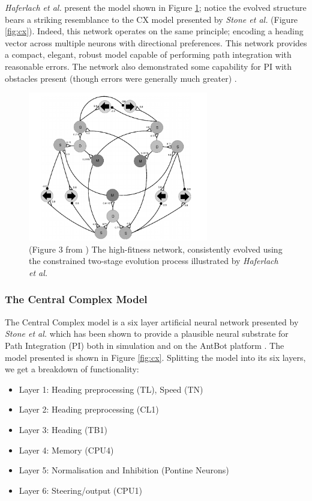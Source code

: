 \documentclass[a4paper,11pt,twoside,openright]{article}
\begin{document}
\textit{Haferlach et al.} present the model shown in Figure
\ref{fig:evolvednetwork}; notice the evolved structure bears a striking
resemblance to the CX model presented by \textit{Stone et al.} (Figure
\ref{fig:cx}). Indeed, this network operates on the same principle; encoding
a heading vector across multiple neurons with directional preferences. This
network provides a compact, elegant, robust model capable of performing
path integration with reasonable errors. The network also demonstrated
some capability for PI with obstacles present (though errors were generally much
greater) \cite{Haferlach2007}.

\begin{figure}[h!]
  \centering
  \includegraphics[width=0.7\textwidth]{EvolvedNetwork}
  \caption{\label{fig:evolvednetwork} (Figure 3 from \cite{Haferlach2007})
    The high-fitness network, consistently evolved using the constrained
    two-stage evolution process illustrated by \textit{Haferlach et al.}
  }
\end{figure}

\subsubsection{The Central Complex Model}
The Central Complex model is a six layer artificial neural network presented by
\textit{Stone et al.} which has been shown to provide a plausible neural
substrate for Path Integration (PI) both in simulation and on the AntBot platform
\cite{Scimeca2017, Stone2017}. The model presented is shown in Figure
\ref{fig:cx}. Splitting the model into its six layers, we get a breakdown of
functionality:
\newline
\par

\begin{itemize}
\item{Layer 1: Heading preprocessing (TL), Speed (TN)}
\item{Layer 2: Heading preprocessing (CL1)}
\item{Layer 3: Heading (TB1)}
\item{Layer 4: Memory (CPU4)}
\item{Layer 5: Normalisation and Inhibition (Pontine Neurons)}
\item{Layer 6: Steering/output (CPU1)}
\end{itemize}
\end{document}
